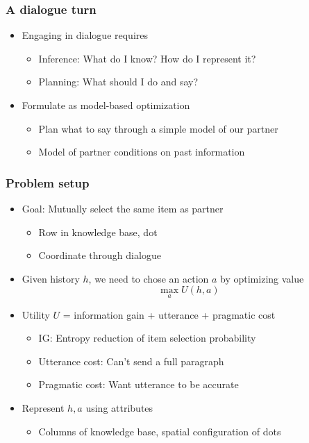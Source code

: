 \documentclass{beamer}
\begin{document}
\begin{frame}
\frametitle{A dialogue turn}
\begin{itemize}
\item Engaging in dialogue requires
    \begin{itemize}
    \item Inference: What do I know? How do I represent it?
    \item Planning: What should I do and say?
    \end{itemize}
\item Formulate as model-based optimization
    \begin{itemize}
    \item Plan what to say through a simple model of our partner
    \item Model of partner conditions on past information
    \end{itemize}
\end{itemize}
\end{frame}

\begin{frame}
\frametitle{Problem setup}
\begin{itemize}
\item Goal: Mutually select the same item as partner
    \begin{itemize}
    \item Row in knowledge base, dot
    \item Coordinate through dialogue
    \end{itemize}
\item Given history $h$,
we need to chose an action $a$ by optimizing value
\begin{equation*}
\max_a U(h, a)
\end{equation*}
\item Utility $U$ = information gain + utterance + pragmatic cost
    \begin{itemize}
    \item IG: Entropy reduction of item selection probability
    \item Utterance cost: Can't send a full paragraph
    \item Pragmatic cost: Want utterance to be accurate
    \end{itemize}
\item Represent $h,a$ using attributes
    \begin{itemize}
    \item Columns of knowledge base, spatial configuration of dots
    \end{itemize}
\end{itemize}
\end{frame}
\end{document}
